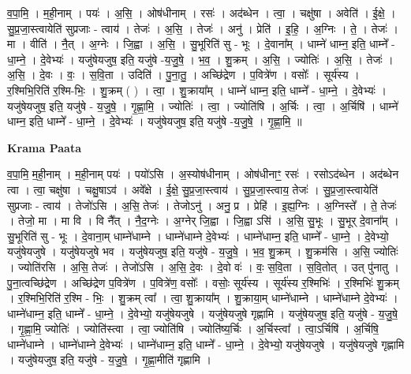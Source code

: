 \documentclass[17pt]{extarticle}
\begin{document}
व॒पा॒मि॒ । म॒ही॒नाम् । पयः॑ । अ॒सि॒ । ओष॑धीनाम् । रसः॑ । अद॑ब्धेन । त्वा॒ । चक्षु॑षा । अवेति॑ । ई॒क्षे॒ । सु॒प्र॒जा॒स्त्वायेति॑ सुप्रजाः - त्वाय॑ । तेजः॑ । अ॒सि॒ । तेजः॑ । अनु॑ । प्रेति॑ । इ॒हि॒ । अ॒ग्निः । ते॒ । तेजः॑ । मा । वीति॑ । नै॒त् । अ॒ग्नेः । जि॒ह्वा । अ॒सि॒ । सु॒भूरिति॑ सु - भूः । दे॒वाना᳚म् । धाम्ने॑ धाम्न॒ इति॒ धाम्ने᳚ - धा॒म्ने॒ । दे॒वेभ्यः॑ । यजु॑षेयजुष॒ इति॒ यजु॑षे -य॒जु॒षे॒ । भ॒व॒ । शु॒क्रम् । अ॒सि॒ । ज्योतिः॑ । अ॒सि॒ । तेजः॑ । अ॒सि॒ । दे॒वः । वः॒ । स॒वि॒ता । उदिति॑ । पु॒ना॒तु॒ । अच्छि॑द्रेण । प॒वित्रे॑ण । वसोः᳚ । सूर्य॑स्य । र॒श्मिभि॒रिति॑ र॒श्मि-भिः॒ । शु॒क्रम् ( ) । त्वा॒ । शु॒क्राया᳚म् । धाम्ने॑ धाम्न॒ इति॒ धाम्ने᳚ - धा॒म्ने॒ । दे॒वेभ्यः॑ । यजु॑षेयजुष॒ इति॒ यजु॑षे - य॒जु॒षे॒ । गृ॒ह्णा॒मि॒ । ज्योतिः॑ । त्वा॒ । ज्योति॑षि । अ॒र्चिः । त्वा॒ । अ॒र्चिषि॑ । धाम्ने॑ धाम्न॒ इति॒ धाम्ने᳚ - धा॒म्ने॒ । दे॒वेभ्यः॑ । यजु॑षेयजुष॒ इति॒ यजु॑षे -य॒जु॒षे॒ । गृ॒ह्णा॒मि॒ ॥  \newline


\textbf{Krama Paata} \newline

व॒पा॒मि॒ म॒ही॒नाम् । म॒ही॒नाम् पयः॑ । पयो॑ऽसि । अ॒स्योष॑धीनाम् । ओष॑धीनाꣳ॒॒ रसः॑ । रसोऽद॑ब्धेन । अद॑ब्धेन त्वा । त्वा॒ चक्षु॑षा । चक्षु॒षाऽव॑ । अवे᳚क्षे । ई॒क्षे॒ सु॒प्र॒जा॒स्त्वाय॑ । सु॒प्र॒जा॒स्त्वाय॒ तेजः॑ । सु॒प्र॒जा॒स्त्वायेति॑ सुप्रजाः - त्वाय॑ । तेजो॑ऽसि । अ॒सि॒ तेजः॑ । तेजोऽनु॑ । अनु॒ प्र । प्रेहि॑ । इ॒ह्य॒ग्निः । अ॒ग्निस्ते᳚ । ते॒ तेजः॑ । तेजो॒ मा । मा वि । वि नै᳚त् । नै॒द॒ग्नेः । अ॒ग्नेर् जि॒ह्वा । जि॒ह्वा ऽसि॑ । अ॒सि॒ सु॒भूः । सु॒भूर् दे॒वाना᳚म् । सु॒भूरिति॑ सु - भूः । दे॒वाना॒म् धाम्ने॑धाम्ने । धाम्ने॑धाम्ने दे॒वेभ्यः॑ । धाम्ने॑धाम्न॒ इति॒ धाम्ने᳚ - धा॒म्ने॒ । दे॒वेभ्यो॒ यजु॑षेयजुषे । यजु॑षेयजुषे भव । यजु॑षेयजुष॒ इति॒ यजु॑षे - य॒जु॒षे॒ । भ॒व॒ शु॒क्रम् । शु॒क्रम॑सि । अ॒सि॒ ज्योतिः॑ । ज्योति॑रसि । अ॒सि॒ तेजः॑ । तेजो॑ऽसि । अ॒सि॒ दे॒वः । दे॒वो वः॑ । वः॒ स॒वि॒ता । स॒वि॒तोत् । उत् पु॑नातु । पु॒ना॒त्वच्छि॑द्रेण । अच्छि॑द्रेण प॒वित्रे॑ण । प॒वित्रे॑ण॒ वसोः᳚ । वसोः॒ सूर्य॑स्य । सूर्य॑स्य र॒श्मिभिः॑ । र॒श्मिभिः॑ शु॒क्रम् । र॒श्मिभि॒रिति॑ र॒श्मि - भिः॒ । शु॒क्रम् त्वा᳚ । त्वा॒ शु॒क्राया᳚म् । शु॒क्राया॒म् धाम्ने॑धाम्ने । धाम्ने॑धाम्ने दे॒वेभ्यः॑ । धाम्ने॑धाम्न॒ इति॒ धाम्ने᳚ - धा॒म्ने॒ । दे॒वेभ्यो॒ यजु॑षेयजुषे । यजु॑षेयजुषे गृह्णामि । यजु॑षेयजुष॒ इति॒ यजु॑षे - य॒जु॒षे॒ । गृ॒ह्णा॒मि॒ ज्योतिः॑ । ज्योति॑स्त्वा । त्वा॒ ज्योति॑षि । ज्योति॑ष्य॒र्चिः । अ॒र्चिस्त्वा᳚ । त्वा॒ऽर्चिषि॑ । अ॒र्चिषि॒ धाम्ने॑धाम्ने । धाम्ने॑धाम्ने दे॒वेभ्यः॑ । धाम्ने॑धाम्न॒ इति॒ धाम्ने᳚ - धा॒म्ने॒ । दे॒वेभ्यो॒ यजु॑षेयजुषे । यजु॑षेयजुषे गृह्णामि । यजु॑षेयजुष॒ इति॒ यजु॑षे - य॒जु॒षे॒ । गृ॒ह्णा॒मीति॑ गृह्णामि । \newline
\end{document}
